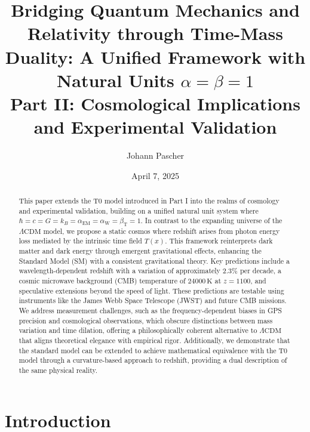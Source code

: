 \documentclass[twocolumn,aps,prl]{revtex4-2}
\newcommand{\Tfield}{T(x)}
\newcommand{\alphaEM}{\alpha_{\text{EM}}}
\newcommand{\alphaW}{\alpha_{\text{W}}}
\newcommand{\betaT}{\beta_{\text{T}}}
\newcommand{\LCDM}{\Lambda\text{CDM}}
\begin{document}
	
	\title{Bridging Quantum Mechanics and Relativity through Time-Mass Duality: A Unified Framework with Natural Units \(\alpha = \beta = 1\) \\ Part II: Cosmological Implications and Experimental Validation}
	\author{Johann Pascher}
	\date{April 7, 2025}
	
	\begin{abstract}
		This paper extends the T0 model introduced in Part I into the realms of cosmology and experimental validation, building on a unified natural unit system where \(\hbar = c = G = k_B = \alphaEM = \alphaW = \betaT = 1\). In contrast to the expanding universe of the \(\LCDM\) model, we propose a static cosmos where redshift arises from photon energy loss mediated by the intrinsic time field \(\Tfield\). This framework reinterprets dark matter and dark energy through emergent gravitational effects, enhancing the Standard Model (SM) with a consistent gravitational theory. Key predictions include a wavelength-dependent redshift with a variation of approximately \(2.3\%\) per decade, a cosmic microwave background (CMB) temperature of \(24000 \, \text{K}\) at \(z = 1100\), and speculative extensions beyond the speed of light. These predictions are testable using instruments like the James Webb Space Telescope (JWST) and future CMB missions. We address measurement challenges, such as the frequency-dependent biases in GPS precision and cosmological observations, which obscure distinctions between mass variation and time dilation, offering a philosophically coherent alternative to \(\LCDM\) that aligns theoretical elegance with empirical rigor. Additionally, we demonstrate that the standard model can be extended to achieve mathematical equivalence with the T0 model through a curvature-based approach to redshift, providing a dual description of the same physical reality.
	\end{abstract}
	
	\maketitle
	
	\section{Introduction}
	\label{sec:introduction}
	
\end{document}
